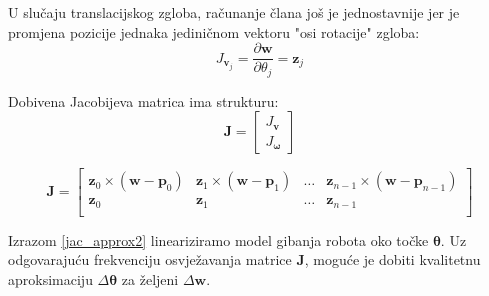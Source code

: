 \documentclass[times, utf8, diplomski, numeric]{fer}
\begin{document}
U slučaju translacijskog zgloba, računanje člana još je jednostavnije jer je promjena pozicije jednaka jediničnom vektoru "osi rotacije" zgloba:
\begin{equation}
J_{\bm{v}_j} = \dfrac{\partial \mathbf{w}}{ \partial \theta_{j}} = \mathbf{z}_{j}
\end{equation}

Dobivena Jacobijeva matrica ima strukturu:
\begin{equation}
\mathbf{J} =
\begin{bmatrix}
J_{\bm{v}}\\
J_{\bm{\omega}}
\end{bmatrix}
\end{equation}

\begin{equation}
\mathbf{J} =
\begin{bmatrix}
\mathbf{z}_{0} \times (\mathbf{w} - \mathbf{p}_{0}) &\mathbf{z}_{1} \times (\mathbf{w} - \mathbf{p}_{1}) &\ldots &\mathbf{z}_{n-1} \times (\mathbf{w} - \mathbf{p}_{n-1})\\
\textbf{z}_{0} &\textbf{z}_{1} &\ldots &\textbf{z}_{n-1}\\
\end{bmatrix}
\end{equation}

Izrazom \ref{jac_approx2} lineariziramo model gibanja robota oko točke $\bm{\theta}$. 
Uz odgovarajuću frekvenciju osvježavanja matrice $\mathbf{J}$, moguće je dobiti kvalitetnu aproksimaciju $\Delta \bm{\theta}$ za željeni $\Delta \mathbf{w}$.
\end{document}
